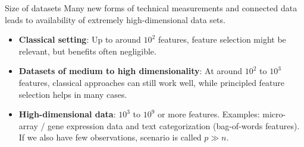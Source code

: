 \documentclass[11pt,compress,t,notes=noshow, xcolor=table]{beamer}
\begin{document}
\begin{vbframe}{Size of datasets}
Many new forms of technical measurements and connected data leads to availability of extremely high-dimensional data sets.

\vspace{0.5cm}
\begin{itemize}
\setlength{\itemsep}{1.2em}
    \item \textbf{Classical setting}: Up to around $10^2$ features, feature selection might be relevant, but benefits often negligible.
    \item \textbf{Datasets of medium to high dimensionality}:
    At around $10^2$ to $10^3$ features, classical approaches can still work well, while principled feature selection helps in many cases.
    \item \textbf{High-dimensional data}: $10^3$ to $10^9$ or more features.
    Examples: micro-array / gene expression data and text categorization (bag-of-words features).
    If we also have few observations, scenario is called $p \gg n$.
\end{itemize}

\end{vbframe}
\end{document}

